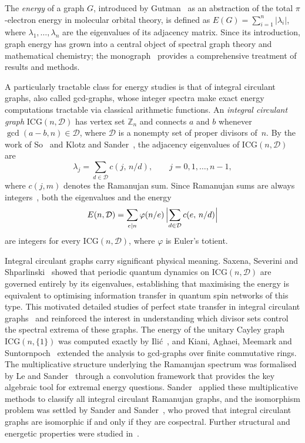 \documentclass[12pt,a4paper]{article}
\theoremstyle{plain}
\theoremstyle{definition}
\newcommand{\Z}{\mathbb{Z}}
\newcommand{\ICG}{\mathrm{ICG}}
\newcommand{\vp}{\varphi}
\begin{document}
The \emph{energy} of a graph $G$, introduced by Gutman~\cite{Gutman1978}
as an abstraction of the total $\pi$-electron energy in molecular orbital
theory, is defined as $E(G)=\sum_{i=1}^{n}|\lambda_i|$, where
$\lambda_1,\ldots,\lambda_n$ are the eigenvalues of its adjacency matrix.
Since its introduction, graph energy has grown into a central object of
spectral graph theory and mathematical chemistry; the monograph~\cite{LiShiGutman2012}
provides a comprehensive treatment of results and methods.

A particularly tractable class for energy studies is that of integral
circulant graphs, also called gcd-graphs, whose integer spectra make
exact energy computations tractable via classical arithmetic functions.
An \emph{integral circulant graph} $\ICG(n,\mathcal{D})$ has vertex set
$\Z_n$ and connects $a$ and $b$ whenever $\gcd(a-b,n)\in\mathcal{D}$,
where $\mathcal{D}$ is a nonempty set of proper divisors of~$n$.  By the
work of So~\cite{So2006} and Klotz and Sander~\cite{KlotzS2007}, the
adjacency eigenvalues of $\ICG(n,\mathcal{D})$ are
\begin{equation}\label{eq:spectrum}
  \lambda_j = \sum_{d\in\mathcal{D}} c(j,\,n/d),
  \qquad j=0,1,\ldots,n-1,
\end{equation}
where $c(j,m)$ denotes the Ramanujan sum.  Since Ramanujan sums are
always integers~\cite[Ch.~8]{ApostolNT}, both the eigenvalues and the energy
\begin{equation}\label{eq:energy}
  E(n,\mathcal{D})
  = \sum_{e\mid n}\vp(n/e)\,\Bigl|\sum_{d\in\mathcal{D}}c(e,\,n/d)\Bigr|
\end{equation}
are integers for every $\ICG(n,\mathcal{D})$, where $\vp$ is Euler's
totient.

Integral circulant graphs carry significant physical meaning.  Saxena,
Severini and Shparlinski~\cite{SaxenaSS2007} showed that periodic quantum
dynamics on $\ICG(n,\mathcal{D})$ are governed entirely by its eigenvalues,
establishing that maximising the energy is equivalent to optimising
information transfer in quantum spin networks of this type.  This motivated
detailed studies of perfect state transfer in integral circulant
graphs~\cite{BasicPS2009,PetkovicB2011} and reinforced the interest in
understanding which divisor sets control the spectral extrema of these
graphs.  The energy of the unitary Cayley graph $\ICG(n,\{1\})$ was
computed exactly by Ili\'c~\cite{Ilic2009}, and Kiani, Aghaei, Meemark and
Suntornpoch~\cite{Kiani2011} extended the analysis to gcd-graphs over
finite commutative rings.  The multiplicative structure underlying the
Ramanujan spectrum was formalised by Le and Sander~\cite{LeSander2012laa,LeSander2012ijnt}
through a convolution framework that provides the key algebraic tool for
extremal energy questions.  Sander~\cite{Sander2015laa} applied these
multiplicative methods to classify all integral circulant Ramanujan graphs,
and the isomorphism problem was settled by Sander and
Sander~\cite{SanderS2015aadm}, who proved that integral circulant graphs
are isomorphic if and only if they are cospectral.  Further structural
and energetic properties were studied in~\cite{IlicBasic2011,Klotz2021}.
\end{document}
